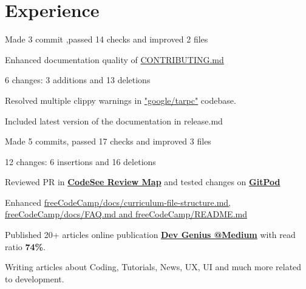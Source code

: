 \documentclass[]{deedy-resume-openfont}
\begin{document}
\hfill
\begin{minipage}[t]{0.66\textwidth} 


\section{Experience}
\vspace{\topsep} %
\begin{tightemize}
\item Made 3 commit ,passed 14 checks and improved 2 files
\item Enhanced documentation quality of \href{https://github.com/RocketChat/Rocket.Chat/pull/26894}{CONTRIBUTING.md} 
\item 6 changes: 3 additions and 13 deletions
\item Resolved multiple clippy warnings in \href{https://github.com/google/tarpc}{"google/tarpc"} codebase.
\item Included latest version of the documentation in release.md
\end{tightemize}
\sectionsep

\vspace{\topsep} %
\begin{tightemize}
\item Made 5 commits, passed 17 checks and improved 3 files
\item 12 changes: 6 insertions and 16 deletions
\item Reviewed PR in \href{https://app.codesee.io/maps/review/github/freeCodeCamp/freeCodeCamp/pr/47553}{\textbf{CodeSee Review Map}} and tested changes on \href{https://gitpod.io/#https://github.com/freeCodeCamp/freeCodeCamp/pull/47553}{\textbf{GitPod}}
\item Enhanced \href{https://github.com/freeCodeCamp/freeCodeCamp/pull/47553}{freeCodeCamp/docs/curriculum-file-structure.md, freeCodeCamp/docs/FAQ.md and freeCodeCamp/README.md}
\end{tightemize}
\sectionsep

\begin{tightemize}
\item Published 20+ articles online publication \href{https://blog.devgenius.io/java-annotations-defe99419d6d}{\textbf{Dev Genius @Medium}} with read ratio \textbf{74\%}.\\
\item Writing articles about Coding, Tutorials, News, UX, UI and much more related to development.
\end{tightemize}
\sectionsep


\end{minipage}
\end{document}
